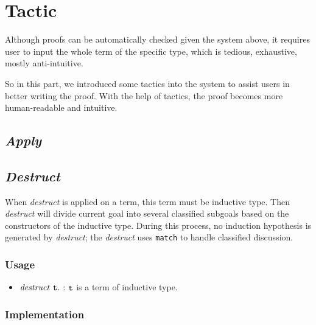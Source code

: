 \section{Tactic}
Although proofs can be automatically checked given the system above, it requires user to input the whole
term of the specific type, which is tedious, exhaustive, mostly anti-intuitive.\par
So in this part, we introduced some tactics into the system 
to assist users in better writing the proof. With the help of
tactics, the proof becomes more human-readable and intuitive.\par

\subsection{\it Apply}

\subsection{\it Destruct}

When {\it destruct} is applied on a term, this term must be inductive type. Then {\it destruct} will divide current goal
into several classified subgoals based on the constructors of the inductive type. During this process, no induction 
hypothesis is generated by {\it destruct}; the {\it destruct} uses {\tt match} to handle classified discussion.

\subsubsection*{Usage}
\begin{itemize}
\item ${\it destruct}\ \tt t.$ : $\tt t$ is a term of inductive type. 
\end{itemize}

\subsubsection*{Implementation}

